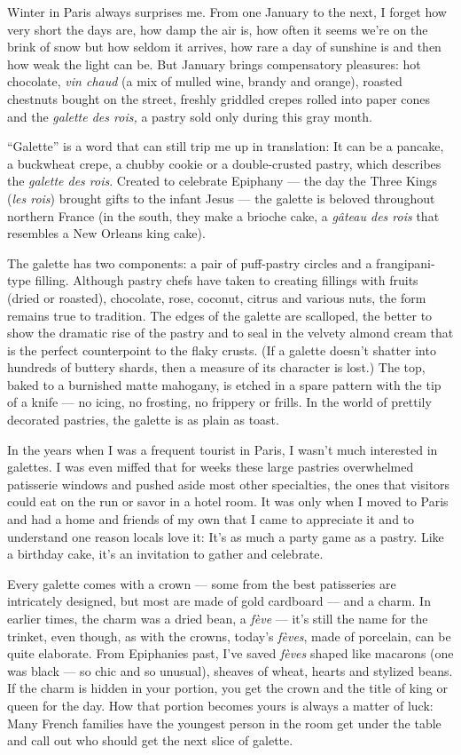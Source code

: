 Winter in Paris always surprises me. From one January to the next, I
forget how very short the days are, how damp the air is, how often it
seems we're on the brink of snow but how seldom it arrives, how rare a
day of sunshine is and then how weak the light can be. But January
brings compensatory pleasures: hot chocolate, \emph{vin chaud} (a mix of
mulled wine, brandy and orange), roasted chestnuts bought on the street,
freshly griddled crepes rolled into paper cones and the \emph{galette
des rois,} a pastry sold only during this gray month.

``Galette'' is a word that can still trip me up in translation: It can
be a pancake, a buckwheat crepe, a chubby cookie or a double-crusted
pastry, which describes the \emph{galette des rois}. Created to
celebrate Epiphany --- the day the Three Kings (\emph{les rois}) brought
gifts to the infant Jesus --- the galette is beloved throughout northern
France (in the south, they make a brioche cake, a \emph{gâteau des rois}
that resembles a New Orleans king cake).

The galette has two components: a pair of puff-pastry circles and a
frangipani-type filling. Although pastry chefs have taken to creating
fillings with fruits (dried or roasted), chocolate, rose, coconut,
citrus and various nuts, the form remains true to tradition. The edges
of the galette are scalloped, the better to show the dramatic rise of
the pastry and to seal in the velvety almond cream that is the perfect
counterpoint to the flaky crusts. (If a galette doesn't shatter into
hundreds of buttery shards, then a measure of its character is lost.)
The top, baked to a burnished matte mahogany, is etched in a spare
pattern with the tip of a knife --- no icing, no frosting, no frippery
or frills. In the world of prettily decorated pastries, the galette is
as plain as toast.

In the years when I was a frequent tourist in Paris, I wasn't much
interested in galettes. I was even miffed that for weeks these large
pastries overwhelmed patisserie windows and pushed aside most other
specialties, the ones that visitors could eat on the run or savor in a
hotel room. It was only when I moved to Paris and had a home and friends
of my own that I came to appreciate it and to understand one reason
locals love it: It's as much a party game as a pastry. Like a birthday
cake, it's an invitation to gather and celebrate.

Every galette comes with a crown --- some from the best patisseries are
intricately designed, but most are made of gold cardboard --- and a
charm. In earlier times, the charm was a dried bean, a \emph{fève} ---
it's still the name for the trinket, even though, as with the crowns,
today's \emph{fèves}, made of porcelain, can be quite elaborate. From
Epiphanies past, I've saved \emph{fèves} shaped like macarons (one was
black --- so chic and so unusual), sheaves of wheat, hearts and stylized
beans. If the charm is hidden in your portion, you get the crown and the
title of king or queen for the day. How that portion becomes yours is
always a matter of luck: Many French families have the youngest person
in the room get under the table and call out who should get the next
slice of galette.

